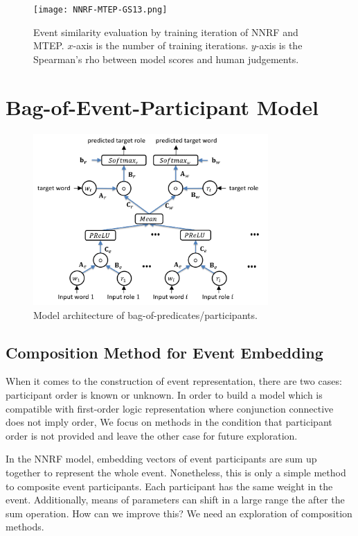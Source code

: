 \documentclass[a4paper]{article}
\begin{document}
\begin{figure}[t]
\centering
\texttt{[image: NNRF-MTEP-GS13.png]}
\caption{\label{fig:NNRF-MTEP-GS13} Event similarity evaluation by training iteration of NNRF and MTEP. $x$-axis is the number of training iterations. $y$-axis is the Spearman's rho between model scores and human judgements. }
\end{figure}



\section{Bag-of-Event-Participant Model} \label{sec:bop}


\begin{figure}[t]
\centering
\includegraphics[width=0.8\textwidth]{BOP.png}
\caption{\label{fig:BOP} Model architecture of bag-of-predicates/participants.}
\end{figure}


\subsection{Composition Method for Event Embedding} \label{sec:composition}
When it comes to the construction of event representation, there are two cases: participant order is known or unknown. In order to build a model which is compatible with first-order logic representation where conjunction connective does not imply order, 
We focus on methods in the condition that participant order is not provided and leave the other case for future exploration.

In the NNRF model, embedding vectors of event participants are sum up together to represent the whole event. Nonetheless, this is only a simple method to composite event participants. Each participant has the same weight in the event. Additionally, means of parameters can shift in a large range the after the sum operation. How can we improve this? We need an exploration of composition methods. 
\end{document}
